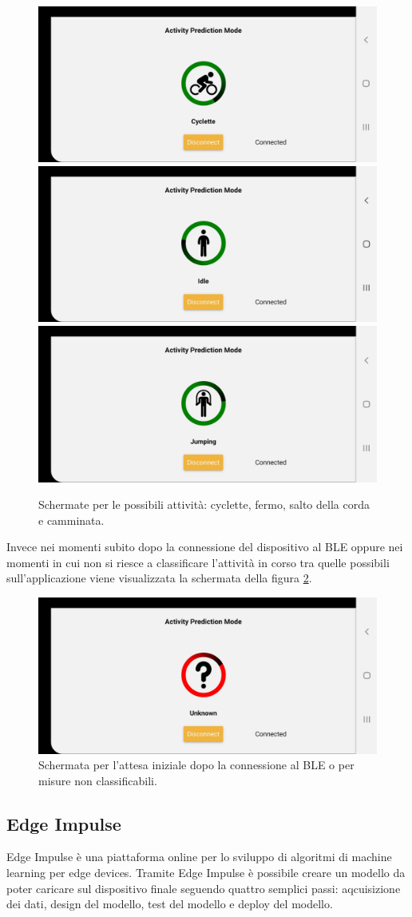 \begin{figure}[tbh]
	\centering
	\includegraphics[width=0.4\linewidth]{./ImageFiles/cyclette}
	\includegraphics[width=0.4\linewidth]{./ImageFiles/idle}
	\includegraphics[width=0.4\linewidth]{./ImageFiles/jumping}
	\caption{Schermate per le possibili attività: cyclette, fermo, salto della corda e camminata.}
	\label{fig:attivitafisica}
\end{figure}
Invece nei momenti subito dopo la connessione del dispositivo al BLE oppure nei momenti in cui non si riesce a classificare l'attività in corso tra quelle possibili sull'applicazione viene visualizzata la schermata della figura \ref{fig:attivitaignota}.
\begin{figure}[tbh]
	\centering
	\includegraphics[width=0.4\linewidth]{./ImageFiles/unknown}
	\caption{Schermata per l'attesa iniziale dopo la connessione al BLE o per misure non classificabili.}
	\label{fig:attivitaignota}
\end{figure}

\subsection{Edge Impulse}
Edge Impulse è una piattaforma online per lo sviluppo di algoritmi di machine learning per edge devices. Tramite Edge Impulse è possibile creare un modello da poter caricare sul dispositivo finale seguendo quattro semplici passi: aqcuisizione dei dati, design del modello, test del modello e deploy del modello. 

